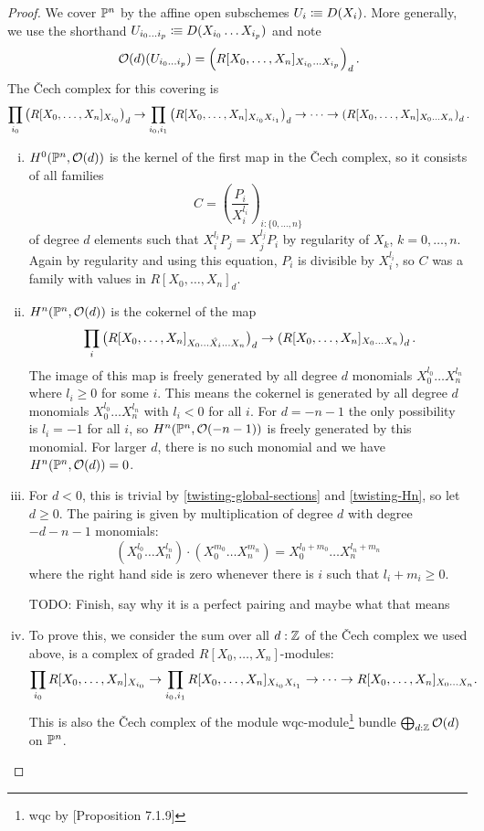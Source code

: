 \begin{proof}
  We cover $\mathbb{P}^n$ by the affine open subschemes $U_i\vcentcolon\mspace{-1.2mu}\equiv D(X_i)$.
  More generally, we use the shorthand $U_{i_0\dots i_p}\vcentcolon\mspace{-1.2mu}\equiv D(X_{i_0}\dots X_{i_p})$
  and note
  \[
    \mathcal O(d)(U_{i_0\dots i_p})=\left(R[X_0,\dots,X_n]_{X_{i_0}\dots X_{i_p}}\right)_d
    \rlap{.}
  \]
  The \v{C}ech complex for this covering is
  \[
    \prod_{i_0}\left(R[X_0,\dots,X_n]_{X_{i_0}}\right)_d \to \prod_{i_0,i_1} \left(R[X_0,\dots,X_n]_{X_{i_0} X_{i_1}}\right)_d \to \dots \to \left(R[X_0,\dots,X_n]_{X_0\dots X_n}\right)_d
    \rlap{.}
  \]
  \begin{enumerate}[(i)]
  \item\label{twisting-global-sections} $H^0(\mathbb{P}^n,\mathcal O(d))$ is the kernel of the first map in the \v{C}ech complex,
    so it consists of all families
    \[
      C=\left(\frac{P_i}{X_{i}^{l_i}}\right)_{i:\{0,\dots,n\}}
    \]
    of degree $d$ elements such that $X_i^{l_i}P_j=X_j^{l_j}P_i$ by regularity of $X_k$, $k=0,\dots,n$.
    Again by regularity and using this equation, $P_i$ is divisible by $X_i^{l_i}$, so $C$ was a family with values in $R[X_0,\dots,X_n]_d$.
  \item\label{twisting-Hn} $H^n(\mathbb{P}^n,\mathcal O(d))$ is the cokernel of the map
    \[
      \prod_{i} \left(R[X_0,\dots,X_n]_{X_0\dots \hat{X_i}\dots X_n}\right)_d \to \left(R[X_0,\dots,X_n]_{X_0\dots X_n}\right)_d
      \rlap{.}
    \]
    The image of this map is freely generated by all degree $d$ monomials $X_0^{l_0}\dots X_n^{l_n}$ where $l_i\geq 0$ for some $i$.
    This means the cokernel is generated by all degree $d$ monomials $X_0^{l_0}\dots X_n^{l_n}$ with $l_i<0$ for all $i$.
    For $d= -n-1$ the only possibility is $l_i=-1$ for all $i$, so $H^n(\mathbb{P}^n,\mathcal O(-n-1))$ is freely generated by this monomial.
    For larger $d$, there is no such monomial and we have $H^n(\mathbb{P}^n,\mathcal O(d))=0$.
  \item For $d<0$, this is trivial by \ref{twisting-global-sections} and \ref{twisting-Hn}, so let $d\geq 0$.
    The pairing is given by multiplication of degree $d$ with degree $-d-n-1$ monomials:
    \[
      (X_0^{l_0}\dots X_n^{l_n}) \cdot (X_0^{m_0}\dots X_n^{m_n})=X_0^{l_0+m_0}\dots X_n^{l_n+m_n}
    \]
    where the right hand side is zero whenever there is $i$ such that $l_i+m_i\geq 0$.
    
    TODO: Finish, say why it is a perfect pairing and maybe what that means
  \item To prove this, we consider the sum over all $d:\mathbb{Z}$ of the \v{C}ech complex we used above, is a complex of graded $R[X_0,\dots,X_n]$-modules:
  \[
    \prod_{i_0}R[X_0,\dots,X_n]_{X_{i_0}} \to \prod_{i_0,i_1} R[X_0,\dots,X_n]_{X_{i_0} X_{i_1}} \to \dots \to R[X_0,\dots,X_n]_{X_0\dots X_n}
    \rlap{.}
  \]
  This is also the \v{C}ech complex of the module wqc-module\footnote{wqc by \cite{draft}[Proposition 7.1.9]} bundle $\bigoplus_{d:\mathbb{Z}}\mathcal O(d)$ on $\mathbb{P}^n$.
  
  \end{enumerate}
\end{proof}
